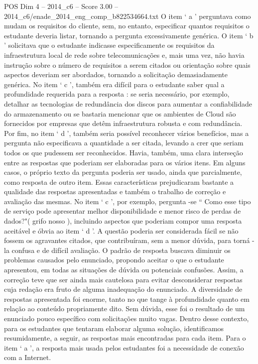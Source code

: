 \begin{textsample}{POS Dim 4 – 2014\_c6 – Score 3.00 – 2014\_c6/enade\_2014\_eng\_comp\_b822534664.txt}
O item ‘ a ’ perguntava como mudam os requisitos do cliente, sem, no entanto, especificar quantos requisitos o estudante deveria listar, tornando a pergunta excessivamente genérica.
O item ‘ b ’ solicitava que o estudante indicasse especificamente os requisitos da infraestrutura local de rede sobre telecomunicações e, mais uma vez, não havia instrução sobre o número de requisitos a serem citados ou orientação sobre quais aspectos deveriam ser abordados, tornando a solicitação demasiadamente genérica.
No item ‘ c ’, também era difícil para o estudante saber qual a profundidade requerida para a resposta : se seria necessário, por exemplo, detalhar as tecnologias de redundância dos discos para aumentar a confiabilidade do armazenamento ou se bastaria mencionar que os ambientes de Cloud são fornecidos por empresas que detêm infraestrutura robusta e com redundância.
Por fim, no item ‘ d ’, também seria possível reconhecer vários benefícios, mas a pergunta não especificava a quantidade a ser citada, levando a crer que seriam todos os que pudessem ser reconhecidos.
Havia, também, uma clara interseção entre as respostas que poderiam ser elaboradas para os vários itens.
Em alguns casos, o próprio texto da pergunta poderia ser usado, ainda que parcialmente, como resposta de outro item.
Essas características prejudicaram bastante a qualidade das respostas apresentadas e também o trabalho de correção e avaliação das mesmas.
No item ‘ c ’, por exemplo, pergunta -se “ Como esse tipo de serviço pode apresentar melhor disponibilidade e menor risco de perdas de dados?"( grifo nosso ), incluindo aspectos que poderiam compor uma resposta aceitável e óbvia ao item ‘ d ’.
A questão poderia ser considerada fácil se não fossem os agravantes citados, que contribuíram, sem a menor dúvida, para torná -la confusa e de difícil avaliação.
O padrão de resposta buscava diminuir os problemas causados pelo enunciado, propondo aceitar o que o estudante apresentou, em todas as situações de dúvida ou potenciais confusões.
Assim, a correção teve que ser ainda mais cautelosa para evitar desconsiderar respostas cuja redação era fruto de alguma inadequação do enunciado.
A diversidade de respostas apresentada foi enorme, tanto no que tange à profundidade quanto em relação ao conteúdo propriamente dito.
Sem dúvida, esse foi o resultado de um enunciado pouco específico com solicitações muito vagas.
Dentro desse contexto, para os estudantes que tentaram elaborar alguma solução, identificamos resumidamente, a seguir, as respostas mais encontradas para cada item.
Para o item ‘ a ’, a resposta mais usada pelos estudantes foi a necessidade de conexão com a Internet.

\end{textsample}
